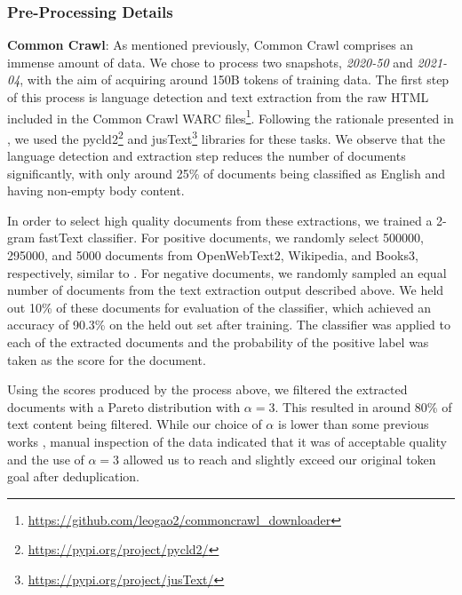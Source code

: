\documentclass[11pt]{article}
\begin{document}
\subsubsection{Pre-Processing Details}
\label{preprocessing-details}
\textbf{Common Crawl}: As mentioned previously, Common Crawl comprises an immense amount of data. We chose to process two snapshots, \textit{2020-50} and \textit{2021-04}, with the aim of acquiring around 150B tokens of training data. The first step of this process is language detection \cite{danilk-2021-langdetect} and text extraction from the raw HTML included in the Common Crawl WARC files\footnote{\url{https://github.com/leogao2/commoncrawl\_downloader}}. Following the rationale presented in \citep{danilk-2021-langdetect}, we used the pycld2\footnote{\url{https://pypi.org/project/pycld2/}} and jusText\footnote{\url{https://pypi.org/project/jusText/}} %
libraries for these tasks. We observe that the language detection and extraction step reduces the number of documents significantly, with only around 25\% of documents being classified as English and having non-empty body content.

In order to select high quality documents from these extractions, we trained a 2-gram fastText \citep{ortizsuarez:hal-02148693} classifier. For positive documents, we randomly select 500000, 295000, and 5000 documents from OpenWebText2, Wikipedia, and Books3, respectively, similar to \cite{brown2020language}. 
For negative documents, we randomly sampled an equal number of documents from the text extraction output described above. We held out 10\% of these documents for evaluation of the classifier, which achieved an accuracy of 90.3\% on the held out set after training. The classifier was applied to each of the extracted documents and the probability of the positive label was taken as the score for the document.

Using the scores produced by the process above, we filtered the extracted documents with a Pareto distribution with $\alpha=3$. This resulted in around 80\% of text content being filtered. While our choice of $\alpha$ is lower than some previous works \citep{brown2020language}, manual inspection of the data indicated that it was of acceptable quality and the use of $\alpha = 3$ allowed us to reach and slightly exceed our original token goal after deduplication.
\end{document}
